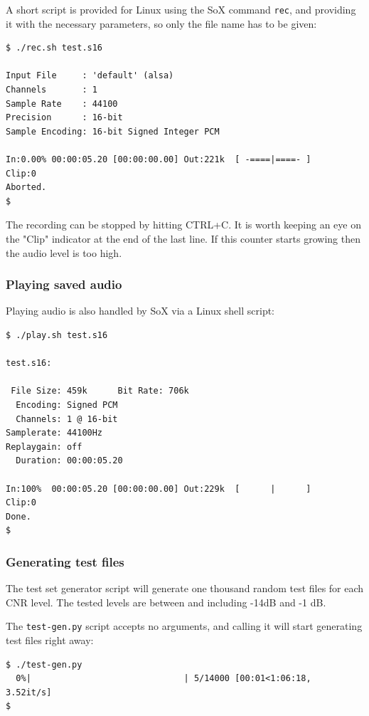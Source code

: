 \documentclass[a4paper]{article}
\begin{document}
A short script is provided for Linux using the SoX command 
\texttt{rec}, and providing it with the necessary parameters, so only 
the file name has to be given:

\begin{lstlisting}
$ ./rec.sh test.s16

Input File     : 'default' (alsa)
Channels       : 1
Sample Rate    : 44100
Precision      : 16-bit
Sample Encoding: 16-bit Signed Integer PCM

In:0.00% 00:00:05.20 [00:00:00.00] Out:221k  [ -====|====- ]     Clip:0
Aborted.
$
\end{lstlisting}

The recording can be stopped by hitting CTRL+C. It is worth keeping an 
eye on the "Clip" indicator at the end of the last line. If this 
counter starts growing then the audio level is too high.

\subsubsection{Playing saved audio}

Playing audio is also handled by SoX via a Linux shell script:

\begin{lstlisting}
$ ./play.sh test.s16 

test.s16:

 File Size: 459k      Bit Rate: 706k
  Encoding: Signed PCM    
  Channels: 1 @ 16-bit   
Samplerate: 44100Hz      
Replaygain: off         
  Duration: 00:00:05.20  

In:100%  00:00:05.20 [00:00:00.00] Out:229k  [      |      ]     Clip:0    
Done.
$
\end{lstlisting}

\subsubsection{Generating test files}

The test set generator script will generate one thousand random test 
files for each CNR level. The tested levels are between and including
-14dB and -1 dB.

The \texttt{test-gen.py} script accepts no arguments, and calling it 
will start generating test files right away:

\begin{lstlisting}
$ ./test-gen.py 
  0%|                              | 5/14000 [00:01<1:06:18,  3.52it/s]
$
\end{lstlisting}
\end{document}

